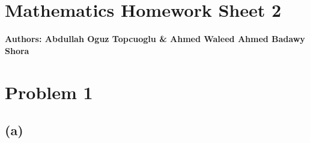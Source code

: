 \documentclass{article}
\begin{document}
\section*{\huge Mathematics Homework Sheet 2}
\begin{flushright}
   \textbf{Authors: Abdullah Oguz Topcuoglu \& Ahmed Waleed Ahmed Badawy Shora}
\end{flushright}




\section*{Problem 1}

\subsection*{(a)}
\end{document}
